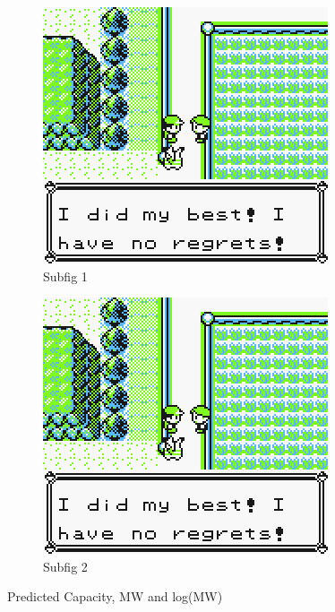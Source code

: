 
\begin{figure}[H]
\centering
\begin{subfigure}[h]{0.5\textwidth}
  \centering
  \includegraphics[width=.9\textwidth]{figures/did-best-no-regrets.png}
  \caption{Subfig 1}
  \label{fig:sub1}
\end{subfigure}%
\begin{subfigure}[h]{0.5\textwidth}
  \centering
  \includegraphics[width=.9\textwidth]{figures/did-best-no-regrets.png}
  \caption{Subfig 2}
  \label{fig:sub2}
\end{subfigure}
\caption{Predicted Capacity, MW and log(MW)}
\label{fig:fig_01}
\end{figure}

